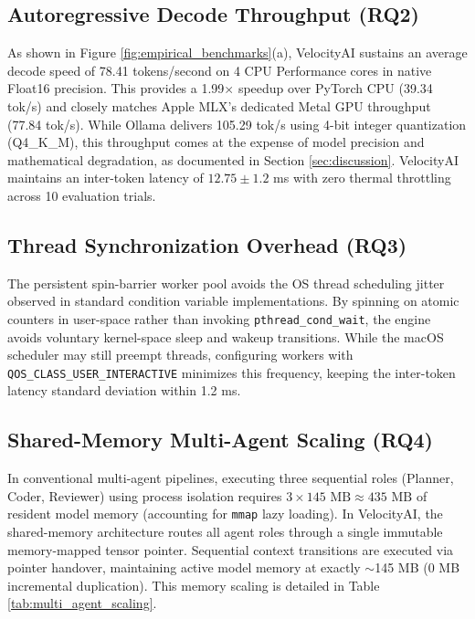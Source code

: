 \documentclass[a4paper,twocolumn,10pt]{article}
\begin{document}
\subsection{Autoregressive Decode Throughput (RQ2)}
As shown in Figure \ref{fig:empirical_benchmarks}(a), VelocityAI sustains an average decode speed of 78.41 tokens/second on 4 CPU Performance cores in native Float16 precision. This provides a 1.99$\times$ speedup over PyTorch CPU (39.34 tok/s) and closely matches Apple MLX's dedicated Metal GPU throughput (77.84 tok/s). While Ollama delivers 105.29 tok/s using 4-bit integer quantization (Q4\_K\_M), this throughput comes at the expense of model precision and mathematical degradation, as documented in Section \ref{sec:discussion}. VelocityAI maintains an inter-token latency of $12.75 \pm 1.2$ ms with zero thermal throttling across 10 evaluation trials.

\subsection{Thread Synchronization Overhead (RQ3)}
The persistent spin-barrier worker pool avoids the OS thread scheduling jitter observed in standard condition variable implementations. By spinning on atomic counters in user-space rather than invoking \texttt{pthread\_cond\_wait}, the engine avoids voluntary kernel-space sleep and wakeup transitions. While the macOS scheduler may still preempt threads, configuring workers with \texttt{QOS\_CLASS\_USER\_INTERACTIVE} \cite{apple2014qos} minimizes this frequency, keeping the inter-token latency standard deviation within 1.2 ms.

\subsection{Shared-Memory Multi-Agent Scaling (RQ4)}
In conventional multi-agent pipelines, executing three sequential roles (Planner, Coder, Reviewer) using process isolation requires $3 \times 145 \text{ MB} \approx 435 \text{ MB}$ of resident model memory (accounting for \texttt{mmap} lazy loading). In VelocityAI, the shared-memory architecture routes all agent roles through a single immutable memory-mapped tensor pointer. Sequential context transitions are executed via pointer handover, maintaining active model memory at exactly $\sim$145 MB (0 MB incremental duplication). This memory scaling is detailed in Table \ref{tab:multi_agent_scaling}.
\end{document}

